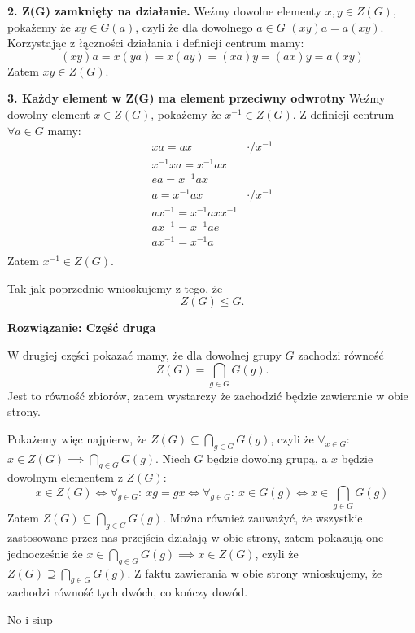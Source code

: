 \documentclass[12pt,a4paper]{article}
\begin{document}
\vskip 0.4cm
\textbf{2. Z(G) zamknięty na działanie.} Weźmy dowolne elementy \(x,y \in Z(G)\), pokażemy że \(xy \in G(a)\), czyli że dla dowolnego \(a \in G\) \((xy)a = a(xy)\). Korzystając z łączności działania i definicji centrum mamy:
\[
(xy)a = x(ya) = x(ay) = (xa)y = (ax)y = a(xy)
\]
Zatem \(xy \in Z(G)\).

\vskip 0.4cm
\textbf{3. Każdy element w Z(G) ma element \sout{przeciwny} odwrotny} Weźmy dowolny element \(x \in Z(G)\), pokażemy że \(x^{-1} \in Z(G)\). Z definicji centrum \(\forall a \in G\) mamy:
\[
\begin{array}{cc}
xa = ax & \cdot /x^{-1} \\
x^{-1}xa = x^{-1} a x & \\
ea = x^{-1} a x & \\
a = x^{-1} a x & \cdot /x^{-1} \\
ax^{-1} = x^{-1} a x x^{-1} & \\
ax^{-1} = x^{-1}ae & \\
ax^{-1} = x^{-1}a & \\
\end{array}
\]
Zatem \(x^{-1} \in Z(G) \).

Tak jak poprzednio wnioskujemy z tego, że
\[
Z(G) \leq G.
\]

\noindent
\textbf{Rozwiązanie: Część druga}


W drugiej części pokazać mamy, że dla dowolnej grupy \(G\) zachodzi równość
\[
Z(G) = \bigcap_{g\in G} G(g) .
\]
Jest to równość zbiorów, zatem wystarczy że zachodzić będzie zawieranie w obie strony. 

\vskip 0.4cm
Pokażemy więc najpierw, że \(Z(G) \subseteq \bigcap_{g\in G} G(g)\), czyli że \( \forall_{x \in G} \): \( x \in Z(G) \implies \bigcap_{g\in G} G(g)\).
Niech \(G\) będzie dowolną grupą, a \(x\) będzie dowolnym elementem z \(Z(G)\):
\[
x \in Z(G) \iff \forall_{g \in G}: \ xg = gx \iff \forall_{g \in G}: \ x \in G(g)
\iff x \in \bigcap_{g \in G} G(g)
\]
Zatem \(Z(G) \subseteq \bigcap_{g\in G} G(g)\). Można również zauważyć, że wszystkie zastosowane przez nas przejścia działają w obie strony, zatem pokazują one jednocześnie że \(x \in \bigcap_{g \in G} G(g) \implies x \in Z(G)\), czyli że \(Z(G) \supseteq \bigcap_{g\in G} G(g)\). Z faktu zawierania w obie strony wnioskujemy, że zachodzi równość tych dwóch, co kończy dowód.

No i siup
\end{document}
